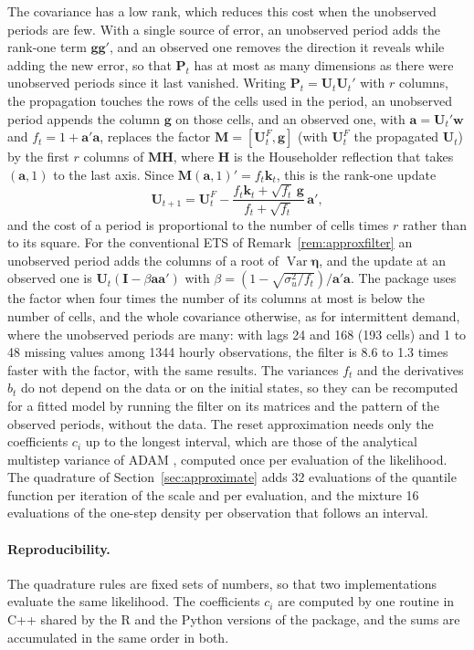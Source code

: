 \documentclass[11pt,a4paper]{article}
\newcommand{\vect}[1]{\mathbf{#1}}
\DeclareMathOperator{\Var}{Var}
\theoremstyle{remark}
\begin{document}
The covariance has a low rank, which reduces this cost when the unobserved periods are few. With a
single source of error, an unobserved period adds the rank-one term $\vect g\vect g'$, and an observed
one removes the direction it reveals while adding the new error, so that $\vect P_t$ has at most as
many dimensions as there were unobserved periods since it last vanished. Writing $\vect P_t =
\vect U_t\vect U_t'$ with $r$ columns, the propagation touches the rows of the cells used in the
period, an unobserved period appends the column $\vect g$ on those cells, and an observed one, with
$\vect a = \vect U_t'\vect w$ and $f_t = 1 + \vect a'\vect a$, replaces the factor
$\vect M = [\vect U_t^{F}, \vect g]$ (with $\vect U_t^{F}$ the propagated $\vect U_t$) by the first $r$
columns of $\vect M\vect H$, where $\vect H$ is the Householder reflection that takes $(\vect a, 1)$ to
the last axis. Since $\vect M(\vect a, 1)' = f_t\vect k_t$, this is the rank-one update
\[
\vect U_{t+1} = \vect U_t^{F} - \frac{f_t\vect k_t + \sqrt{f_t}\,\vect g}{f_t + \sqrt{f_t}}\,\vect a' ,
\]
and the cost of a period is proportional to the number of cells times $r$ rather than to its square.
For the conventional ETS of Remark~\ref{rem:approxfilter} an unobserved period adds the columns of a
root of $\Var\boldsymbol\eta$, and the update at an observed one is $\vect U_t(\vect I -
\beta\vect a\vect a')$ with $\beta = (1 - \sqrt{\sigma_u^2/f_t})/\vect a'\vect a$. The package uses the
factor when four times the number of its columns at most is below the number of cells, and the whole
covariance otherwise, as for intermittent demand, where the unobserved periods are many: with lags 24
and 168 (193 cells) and 1 to 48 missing values among 1344 hourly observations, the filter is 8.6 to
1.3 times faster with the factor, with the same results. The variances $f_t$
and the derivatives $b_t$ do not depend on the data or on the initial states, so they can be
recomputed for a fitted model by running the filter on its matrices and the pattern of the observed
periods, without the data. The reset approximation needs only the coefficients $c_i$ up to the
longest interval, which are those of the analytical multistep variance of ADAM \citep{ADAM}, computed
once per evaluation of the likelihood. The quadrature of Section~\ref{sec:approximate} adds 32
evaluations of the quantile function per iteration of the scale and per evaluation, and the mixture
16 evaluations of the one-step density per observation that follows an interval.

\paragraph{Reproducibility.} The quadrature rules are fixed sets of numbers, so that two
implementations evaluate the same likelihood. The coefficients $c_i$ are computed by one routine in
C++ shared by the R and the Python versions of the package, and the sums are accumulated in the
same order in both.
\end{document}
